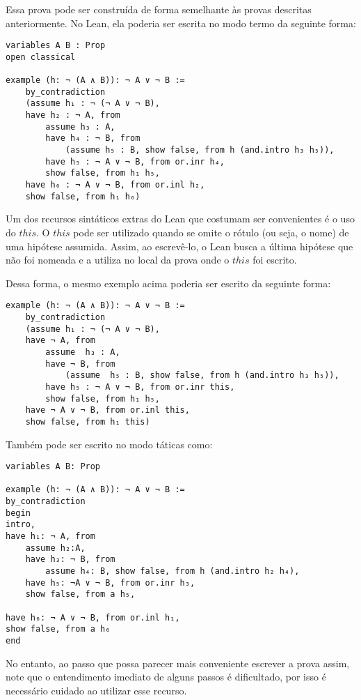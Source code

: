 Essa prova pode ser construída de forma semelhante às provas descritas anteriormente. No Lean, ela poderia ser escrita no modo termo da seguinte forma:
\begin{lstlisting} 
variables A B : Prop
open classical

example (h: ¬ (A ∧ B)): ¬ A ∨ ¬ B := 
    by_contradiction 
    (assume h₁ : ¬ (¬ A ∨ ¬ B),
    have h₂ : ¬ A, from 
        assume h₃ : A,
        have h₄ : ¬ B, from
            (assume h₅ : B, show false, from h (and.intro h₃ h₅)),
        have h₅ : ¬ A ∨ ¬ B, from or.inr h₄,
        show false, from h₁ h₅,   
    have h₆ : ¬ A ∨ ¬ B, from or.inl h₂, 
    show false, from h₁ h₆)
\end{lstlisting}

Um dos recursos sintáticos extras do Lean que costumam ser convenientes é o uso do $this$. O $this$ pode ser utilizado quando se omite o rótulo (ou seja, o nome) de uma hipótese assumida. Assim, ao escrevê-lo, o Lean busca a última hipótese que não foi nomeada e a utiliza no local da prova onde o $this$ foi escrito. 

Dessa forma, o mesmo exemplo acima poderia ser escrito da seguinte forma:

\begin{lstlisting}
example (h: ¬ (A ∧ B)): ¬ A ∨ ¬ B := 
    by_contradiction 
    (assume h₁ : ¬ (¬ A ∨ ¬ B),
    have ¬ A, from 
        assume  h₃ : A,
        have ¬ B, from
            (assume  h₅ : B, show false, from h (and.intro h₃ h₅)),
        have h₅ : ¬ A ∨ ¬ B, from or.inr this,
        show false, from h₁ h₅,   
    have ¬ A ∨ ¬ B, from or.inl this, 
    show false, from h₁ this)
\end{lstlisting}

Também pode ser escrito no modo táticas como:
\begin{lstlisting}
variables A B: Prop

example (h: ¬ (A ∧ B)): ¬ A ∨ ¬ B := 
by_contradiction
begin
intro,
have h₁: ¬ A, from
    assume h₂:A,
    have h₃: ¬ B, from
        assume h₄: B, show false, from h (and.intro h₂ h₄),
    have h₅: ¬A ∨ ¬ B, from or.inr h₃,
    show false, from a h₅,

have h₆: ¬ A ∨ ¬ B, from or.inl h₁,
show false, from a h₆
end
\end{lstlisting}

No entanto, ao passo que possa parecer mais conveniente escrever a prova assim, note que o entendimento imediato de alguns passos é dificultado, por isso é necessário cuidado ao utilizar esse recurso.


